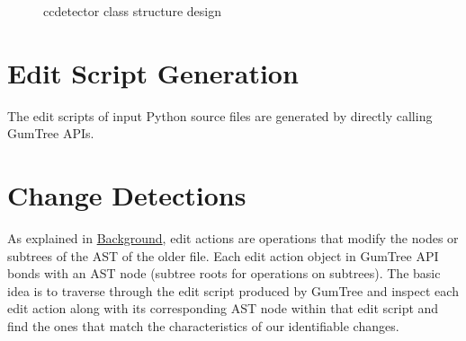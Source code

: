 \begin{figure*}
	\label{fig:ccdetector-class-design}
	\caption{ccdetector class structure design}
\end{figure*}

\section{Edit Script Generation}

The edit scripts of input Python source files are generated by directly calling GumTree APIs.

\section{Change Detections}

As explained in \hyperref[chap:background]{Background}, edit actions are operations that modify the nodes or subtrees of the AST of the older file. Each edit action object in GumTree API bonds with an AST node (subtree roots for operations on subtrees). The basic idea is to traverse through the edit script produced by GumTree and inspect each edit action along with its corresponding AST node within that edit script and find the ones that match the characteristics of our identifiable changes.

